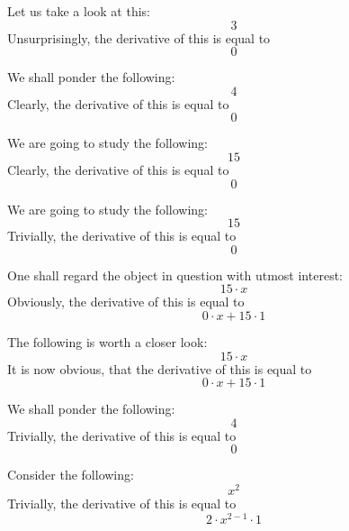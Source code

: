 \documentclass{article}
\begin{document}
Let us take a look at this:
\begin{equation}
3 
\end{equation}
Unsurprisingly, the derivative of this is equal to
\begin{equation}
0 
\end{equation}

We shall ponder the following:
\begin{equation}
4 
\end{equation}
Clearly, the derivative of this is equal to
\begin{equation}
0 
\end{equation}

We are going to study the following:
\begin{equation}
15 
\end{equation}
Clearly, the derivative of this is equal to
\begin{equation}
0 
\end{equation}

We are going to study the following:
\begin{equation}
15 
\end{equation}
Trivially, the derivative of this is equal to
\begin{equation}
0 
\end{equation}

One shall regard the object in question with utmost interest:
\begin{equation}
15 \cdot x 
\end{equation}
Obviously, the derivative of this is equal to
\begin{equation}
0 \cdot x + 15 \cdot 1 
\end{equation}

The following is worth a closer look:
\begin{equation}
15 \cdot x 
\end{equation}
It is now obvious, that the derivative of this is equal to
\begin{equation}
0 \cdot x + 15 \cdot 1 
\end{equation}

We shall ponder the following:
\begin{equation}
4 
\end{equation}
Trivially, the derivative of this is equal to
\begin{equation}
0 
\end{equation}

Consider the following:
\begin{equation}
x ^{2 } 
\end{equation}
Trivially, the derivative of this is equal to
\begin{equation}
2 \cdot x ^{2 - 1 } \cdot 1 
\end{equation}
\end{document}
